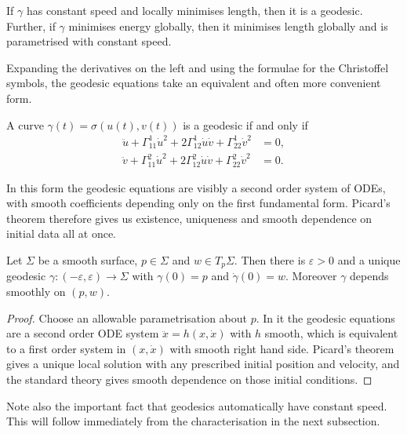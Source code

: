 \begin{corollary}
    If $\gamma$ has constant speed and locally minimises length, then it is a geodesic. Further, if $\gamma$ minimises energy globally, then it minimises length globally and is parametrised with constant speed.
\end{corollary}

Expanding the derivatives on the left and using the formulae for the Christoffel symbols, the geodesic equations take an equivalent and often more convenient form.

\begin{corollary}
    A curve $\gamma(t) = \sigma(u(t), v(t))$ is a geodesic if and only if
    \begin{align*}
        \ddot u + \Gamma^1_{11}\dot u^2 + 2\Gamma^1_{12}\dot u \dot v + \Gamma^1_{22}\dot v^2 &= 0, \\
        \ddot v + \Gamma^2_{11}\dot u^2 + 2\Gamma^2_{12}\dot u \dot v + \Gamma^2_{22}\dot v^2 &= 0.
    \end{align*}
\end{corollary}

In this form the geodesic equations are visibly a second order system of ODEs, with smooth coefficients depending only on the first fundamental form. Picard's theorem therefore gives us existence, uniqueness and smooth dependence on initial data all at once.

\begin{proposition}
    Let $\Sigma$ be a smooth surface, $p \in \Sigma$ and $w \in T_p\Sigma$. Then there is $\varepsilon > 0$ and a unique geodesic $\gamma: (-\varepsilon,\varepsilon) \rightarrow \Sigma$ with $\gamma(0) = p$ and $\dot\gamma(0) = w$. Moreover $\gamma$ depends smoothly on $(p, w)$.
\end{proposition}
\begin{proof}
    Choose an allowable parametrisation about $p$. In it the geodesic equations are a second order ODE system $\ddot x = h(x, \dot x)$ with $h$ smooth, which is equivalent to a first order system in $(x, \dot x)$ with smooth right hand side. Picard's theorem gives a unique local solution with any prescribed initial position and velocity, and the standard theory gives smooth dependence on those initial conditions.
\end{proof}

Note also the important fact that geodesics automatically have constant speed. This will follow immediately from the characterisation in the next subsection.

